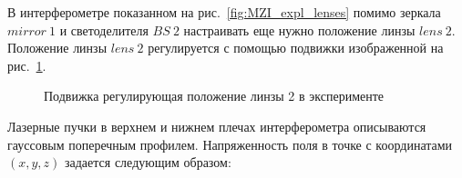 В интерферометре показанном на рис.~\ref{fig:MZI_expl_lenses} помимо зеркала $mirror\ 1$ и светоделителя $BS\ 2$ настраивать еще нужно положение линзы $lens\ 2$. Положение линзы $lens\ 2$ регулируется с помощью подвижки изображенной на рис.~\ref{fig:lense_mount}. 

\begin{figure}[ht]
\caption{Подвижка регулирующая положение линзы 2 в эксперименте \cite{standa_stage}}
\label{fig:lense_mount}
\end{figure}

Лазерные пучки в верхнем и нижнем плечах интерферометра описываются гауссовым поперечным профилем. Напряженность поля в точке с координатами $(x,y,z)$ задается следующим образом: 

